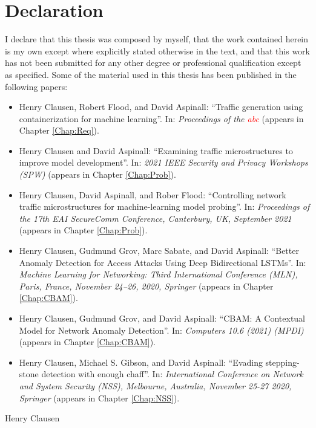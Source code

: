 \documentclass[phd,ilcc,twoside]{infthesis}
\begin{document}
\chapter*{Declaration}

I declare that this thesis was composed by myself, that the work contained herein is my own except where explicitly stated otherwise in the text, and that this work has not been submitted for any other degree or professional qualification except as specified. Some of the material used in this thesis has been published in the following papers:

\begin{itemize}
\item Henry Clausen, Robert Flood, and David Aspinall: ``Traffic generation using containerization for machine learning''. In: \textit{Proceedings of the \textcolor{red}{abc}} (appears in Chapter \ref{Chap:Req}). 
\item Henry Clausen and David Aspinall: ``Examining traffic microstructures to improve model development''. In: \textit{2021 IEEE Security and Privacy Workshops (SPW)} (appears in Chapter \ref{Chap:Prob}).
\item Henry Clausen, David Aspinall, and Rober Flood: ``Controlling network traffic microstructures for machine-learning model probing''. In: \textit{Proceedings of the 17th EAI SecureComm Conference, Canterbury, UK, September 2021} (appears in Chapter \ref{Chap:Prob}).
\item Henry Clausen, Gudmund Grov, Marc Sabate, and David Aspinall: ``Better Anomaly Detection for Access Attacks Using Deep Bidirectional LSTMs''. In: \textit{Machine Learning for Networking: Third International Conference (MLN), Paris, France, November 24–26, 2020, Springer}  (appears in Chapter \ref{Chap:CBAM}).
\item Henry Clausen, Gudmund Grov, and David Aspinall: ``CBAM: A Contextual Model for Network Anomaly Detection''. In: \textit{Computers 10.6 (2021) (MPDI)} (appears in Chapter \ref{Chap:CBAM}).
\item Henry Clausen, Michael S. Gibson, and David Aspinall: ``Evading stepping-stone detection with enough chaff''. In: \textit{International Conference on Network and System Security (NSS), Melbourne, Australia, November 25-27 2020, Springer} (appears in Chapter \ref{Chap:NSS}).
\end{itemize}

\hspace*{0pt}\hfill Henry Clausen
\end{document}
